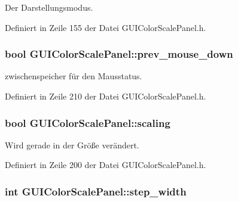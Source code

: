 Der Darstellungsmodus. 



Definiert in Zeile 155 der Datei G\-U\-I\-Color\-Scale\-Panel.\-h.

\hypertarget{classGUIColorScalePanel_ac7050aa7729236561154b0b9be894ed6}{
\subsubsection[{prev\-\_\-mouse\-\_\-down}]{\setlength{\rightskip}{0pt plus 5cm}bool G\-U\-I\-Color\-Scale\-Panel\-::prev\-\_\-mouse\-\_\-down\hspace{0.3cm}{\ttfamily [private]}}}\label{classGUIColorScalePanel_ac7050aa7729236561154b0b9be894ed6}


zwischenspeicher für den Mausstatus. 



Definiert in Zeile 210 der Datei G\-U\-I\-Color\-Scale\-Panel.\-h.

\hypertarget{classGUIColorScalePanel_aec005c07c64a17ffe6d362f4de0a04b1}{
\subsubsection[{scaling}]{\setlength{\rightskip}{0pt plus 5cm}bool G\-U\-I\-Color\-Scale\-Panel\-::scaling\hspace{0.3cm}{\ttfamily [private]}}}\label{classGUIColorScalePanel_aec005c07c64a17ffe6d362f4de0a04b1}


Wird gerade in der Größe verändert. 



Definiert in Zeile 200 der Datei G\-U\-I\-Color\-Scale\-Panel.\-h.

\hypertarget{classGUIColorScalePanel_a5f9789cc727854594c7d29c392578427}{
\subsubsection[{step\-\_\-width}]{\setlength{\rightskip}{0pt plus 5cm}int G\-U\-I\-Color\-Scale\-Panel\-::step\-\_\-width\hspace{0.3cm}{\ttfamily [private]}}}\label{classGUIColorScalePanel_a5f9789cc727854594c7d29c392578427}


